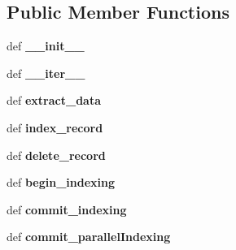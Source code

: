 \subsection*{Public Member Functions}
\begin{DoxyCompactItemize}
\item 
\hypertarget{classcheshire3_1_1index_1_1_simple_index_aba101292f6917b6b58c29df07a268f2b}{def {\bfseries \-\_\-\-\_\-init\-\_\-\-\_\-}}\label{classcheshire3_1_1index_1_1_simple_index_aba101292f6917b6b58c29df07a268f2b}

\item 
\hypertarget{classcheshire3_1_1index_1_1_simple_index_a070640e41a8f47fb5c66c774ee5e4fc3}{def {\bfseries \-\_\-\-\_\-iter\-\_\-\-\_\-}}\label{classcheshire3_1_1index_1_1_simple_index_a070640e41a8f47fb5c66c774ee5e4fc3}

\item 
\hypertarget{classcheshire3_1_1index_1_1_simple_index_abd9cfb87a0b4a89ee887f02a78755bda}{def {\bfseries extract\-\_\-data}}\label{classcheshire3_1_1index_1_1_simple_index_abd9cfb87a0b4a89ee887f02a78755bda}

\item 
\hypertarget{classcheshire3_1_1index_1_1_simple_index_a05040b2e3ab4905ab2276c74f174606e}{def {\bfseries index\-\_\-record}}\label{classcheshire3_1_1index_1_1_simple_index_a05040b2e3ab4905ab2276c74f174606e}

\item 
\hypertarget{classcheshire3_1_1index_1_1_simple_index_a69c18b8cd081c421dee51890b8119e8c}{def {\bfseries delete\-\_\-record}}\label{classcheshire3_1_1index_1_1_simple_index_a69c18b8cd081c421dee51890b8119e8c}

\item 
\hypertarget{classcheshire3_1_1index_1_1_simple_index_a2b141dc4d688260eab173c4ddb20818f}{def {\bfseries begin\-\_\-indexing}}\label{classcheshire3_1_1index_1_1_simple_index_a2b141dc4d688260eab173c4ddb20818f}

\item 
\hypertarget{classcheshire3_1_1index_1_1_simple_index_a78ee65ef47522649a42a50454ff50aee}{def {\bfseries commit\-\_\-indexing}}\label{classcheshire3_1_1index_1_1_simple_index_a78ee65ef47522649a42a50454ff50aee}

\item 
\hypertarget{classcheshire3_1_1index_1_1_simple_index_a2f412ec285a903093acd33542a4342c1}{def {\bfseries commit\-\_\-parallel\-Indexing}}\label{classcheshire3_1_1index_1_1_simple_index_a2f412ec285a903093acd33542a4342c1}


\end{DoxyCompactItemize}
